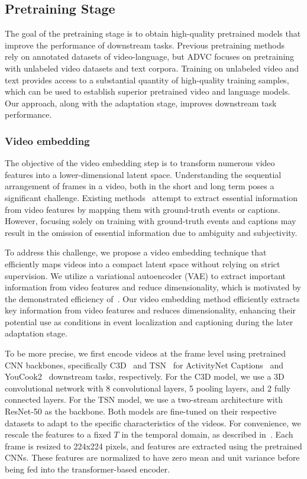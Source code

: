 \subsection{Pretraining Stage}
\label{subsec:pretraining}
The goal of the pretraining stage is to obtain high-quality pretrained models that improve the performance of downstream tasks.
Previous pretraining methods~\cite{Zhang2022-ni,Yang2023-fm} rely on annotated datasets of video-language, but ADVC focuses on pretraining with unlabeled video datasets and text corpora.
Training on unlabeled video and text provides access to a substantial quantity of high-quality training samples, which can be used to establish superior pretrained video and language models.
Our approach, along with the adaptation stage, improves downstream task performance.

\subsubsection{Video embedding}
The objective of the video embedding step is to transform numerous video features into a lower-dimensional latent space.
Understanding the sequential arrangement of frames in a video, both in the short and long term poses a significant challenge.
Existing methods~\cite{Krishna2017-pw,Mun2019-ap,Deng2021-qd,Yang2023-fm} attempt to extract essential information from video features by mapping them with ground-truth events or captions.
However, focusing solely on training with ground-truth events and captions may result in the omission of essential information due to ambiguity and subjectivity.

To address this challenge, we propose a video embedding technique that efficiently maps videos into a compact latent space without relying on strict supervision.
We utilize a variational autoencoder (VAE) to extract important information from video features and reduce dimensionality, which is motivated by the demonstrated efficiency of~\cite{Zhang2017-jc,Wu2016-bh}.
Our video embedding method efficiently extracts key information from video features and reduces dimensionality, enhancing their potential use as conditions in event localization and captioning during the later adaptation stage.

To be more precise, we first encode videos at the frame level using pretrained CNN backbones, specifically C3D~\cite{Tran2015-uq} and TSN~\cite{Wang2019-xv} for ActivityNet Captions~\cite{Krishna2017-pw} and YouCook2~\cite{Zhou2018-eq} downstream tasks, respectively.
For the C3D model, we use a 3D convolutional network with 8 convolutional layers, 5 pooling layers, and 2 fully connected layers.
For the TSN model, we use a two-stream architecture with ResNet-50 as the backbone.
Both models are fine-tuned on their respective datasets to adapt to the specific characteristics of the videos.
For convenience, we rescale the features to a fixed $T$ in the temporal domain, as described in~\cite{Wang2021-zi}.
Each frame is resized to 224x224 pixels, and features are extracted using the pretrained CNNs.
These features are normalized to have zero mean and unit variance before being fed into the transformer-based encoder.

